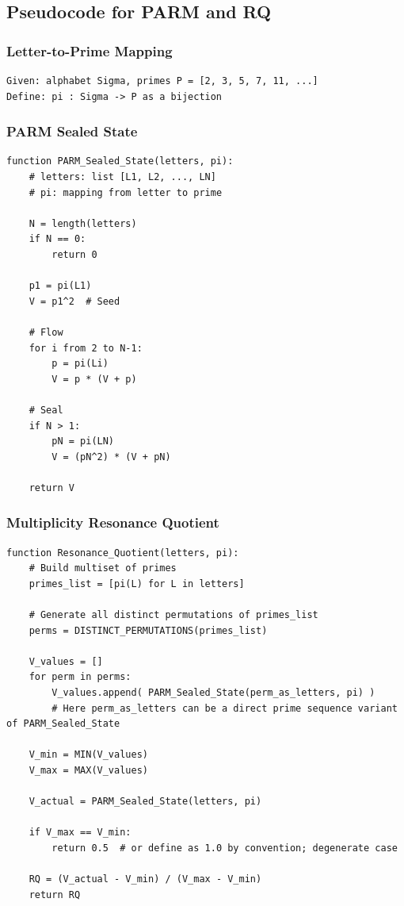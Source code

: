 \documentclass[11pt]{article}
\begin{document}
\subsection{Pseudocode for PARM and RQ}

\subsubsection{Letter-to-Prime Mapping}

\begin{verbatim}
Given: alphabet Sigma, primes P = [2, 3, 5, 7, 11, ...]
Define: pi : Sigma -> P as a bijection
\end{verbatim}

\subsubsection{PARM Sealed State}

\begin{verbatim}
function PARM_Sealed_State(letters, pi):
    # letters: list [L1, L2, ..., LN]
    # pi: mapping from letter to prime

    N = length(letters)
    if N == 0:
        return 0

    p1 = pi(L1)
    V = p1^2  # Seed

    # Flow
    for i from 2 to N-1:
        p = pi(Li)
        V = p * (V + p)

    # Seal
    if N > 1:
        pN = pi(LN)
        V = (pN^2) * (V + pN)

    return V
\end{verbatim}

\subsubsection{Multiplicity Resonance Quotient}

\begin{verbatim}
function Resonance_Quotient(letters, pi):
    # Build multiset of primes
    primes_list = [pi(L) for L in letters]

    # Generate all distinct permutations of primes_list
    perms = DISTINCT_PERMUTATIONS(primes_list)

    V_values = []
    for perm in perms:
        V_values.append( PARM_Sealed_State(perm_as_letters, pi) )
        # Here perm_as_letters can be a direct prime sequence variant of PARM_Sealed_State

    V_min = MIN(V_values)
    V_max = MAX(V_values)

    V_actual = PARM_Sealed_State(letters, pi)

    if V_max == V_min:
        return 0.5  # or define as 1.0 by convention; degenerate case

    RQ = (V_actual - V_min) / (V_max - V_min)
    return RQ
\end{verbatim}
\end{document}
